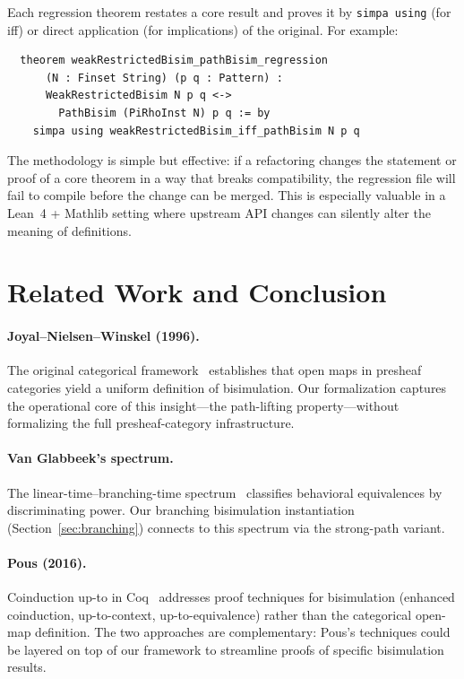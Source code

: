 \documentclass[11pt]{article}
\begin{document}
Each regression theorem restates a core result and proves it by
\texttt{simpa using} (for iff) or direct application (for implications)
of the original.  For example:

\begin{verbatim}
  theorem weakRestrictedBisim_pathBisim_regression
      (N : Finset String) (p q : Pattern) :
      WeakRestrictedBisim N p q <->
        PathBisim (PiRhoInst N) p q := by
    simpa using weakRestrictedBisim_iff_pathBisim N p q
\end{verbatim}

The methodology is simple but effective: if a refactoring changes the
statement or proof of a core theorem in a way that breaks
compatibility, the regression file will fail to compile before the
change can be merged.  This is especially valuable in a Lean~4 +
Mathlib setting where upstream API changes can silently alter the
meaning of definitions.


\section{Related Work and Conclusion}\label{sec:conclusion}

\paragraph{Joyal--Nielsen--Winskel (1996).}
The original categorical framework~\cite{JoyalNielsenWinskel1996}
establishes that open maps in presheaf categories yield a uniform
definition of bisimulation.  Our formalization captures the operational
core of this insight---the path-lifting property---without formalizing
the full presheaf-category infrastructure.

\paragraph{Van Glabbeek's spectrum.}
The linear-time--branching-time
spectrum~\cite{vanGlabbeek1993,vanGlabbeek2001} classifies behavioral
equivalences by discriminating power.  Our branching bisimulation
instantiation (Section~\ref{sec:branching}) connects to this spectrum
via the strong-path variant.

\paragraph{Pous (2016).}
Coinduction up-to in Coq~\cite{Pous2016} addresses proof techniques
for bisimulation (enhanced coinduction, up-to-context, up-to-equivalence)
rather than the categorical open-map definition.  The two approaches are
complementary: Pous's techniques could be layered on top of our
framework to streamline proofs of specific bisimulation results.
\end{document}

